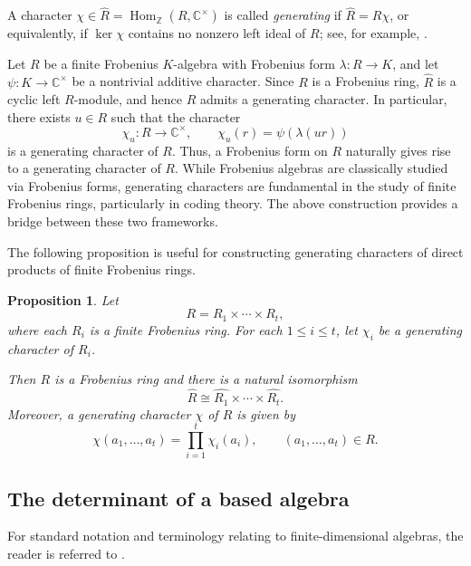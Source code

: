 \documentclass[11pt,reqno]{amsart}
\theoremstyle{plain}
\newtheorem{prop}[thm]{Proposition}
\theoremstyle{remark}
\theoremstyle{definition}
\newcommand{\soc}{\mathop{\mathrm{soc}}\nolimits}
\newcommand{\rad}{\mathop{\mathrm{rad}}\nolimits}
\begin{document}
A character $\chi \in \widehat{R} = \operatorname{Hom}_{\mathbb{Z}}(R,\mathbb{C}^\times)$ is called \emph{generating} if $\widehat{R} = R\chi$, or equivalently, if $\ker \chi$ contains no nonzero left ideal of $R$; see, for example, \cite{Hon-Thom2001}.

Let $R$ be a finite Frobenius $K$-algebra with Frobenius form $\lambda : R \to K$, and let $\psi : K \to \mathbb{C}^\times$ be a nontrivial additive character. Since $R$ is a Frobenius ring, $\widehat{R}$ is a cyclic left $R$-module, and hence $R$ admits a generating character. In particular, there exists $u \in R$ such that the character
\[
\chi_u : R \to \mathbb{C}^\times, \qquad \chi_u(r) = \psi(\lambda(ur))
\]
is a generating character of $R$. 
Thus, a Frobenius form on $R$ naturally gives rise to a generating character of $R$.
While Frobenius algebras are classically studied via Frobenius forms, generating characters are fundamental in the study of finite Frobenius rings, particularly in coding theory. The above construction provides a bridge between these two frameworks.

The following proposition is useful for constructing generating characters of direct products of finite Frobenius rings.

\begin{prop}
Let 
\[
R = R_1 \times \cdots \times R_t,
\]
where each $R_i$ is a finite Frobenius ring. For each $1 \le i \le t$, let $\chi_i$ be a generating character of $R_i$. 

Then $R$ is a Frobenius ring and there is a natural isomorphism
\[
\widehat{R} \cong \widehat{R_1} \times \cdots \times \widehat{R_t}.
\]
Moreover, a generating character $\chi$ of $R$ is given by
\[
\chi(a_1,\dots,a_t)
=
\prod_{i=1}^t \chi_i(a_i),
\qquad (a_1,\dots,a_t) \in R.
\]

\end{prop}



\subsection{The determinant of a based algebra}
For standard notation and terminology relating to finite-dimensional algebras, the reader is referred to \cite{Assem-Ibrahim, Benson-Rep-coh}.
\end{document}
